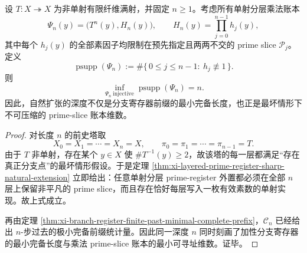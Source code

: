 \begin{corollary}\label{cor:xi-branch-register-depth-primeslice-addressability}
设 \(T:X\twoheadrightarrow X\) 为非单射有限纤维满射，并固定 \(n\ge 1\)。考虑所有单射分层乘法账本
\[
\Psi_n(y)=\bigl(T^n(y),H_n(y)\bigr),
\qquad
H_n(y)=\prod_{j=0}^{n-1}h_j(y),
\]
其中每个 \(h_j(y)\) 的全部素因子均限制在预先指定且两两不交的 prime slice \(\mathcal P_j\)。定义
\[
\operatorname{psupp}(\Psi_n):=\#\{\,0\le j\le n-1:\ h_j\not\equiv 1\,\}.
\]
则
\[
\inf_{\Psi_n\ \mathrm{injective}}\operatorname{psupp}(\Psi_n)=n.
\]
因此，自然扩张的深度不仅是分支寄存器前缀的最小完备长度，也正是最坏情形下不可压缩的 prime-slice 账本维数。
\end{corollary}
\begin{proof}
对长度 \(n\) 的前史塔取
\[
X_0=X_1=\cdots=X_n=X,
\qquad
\pi_0=\pi_1=\cdots=\pi_{n-1}=T.
\]
由于 \(T\) 非单射，存在某个 \(y\in X\) 使 \(\#T^{-1}(y)\ge 2\)，故该塔的每一层都满足“存在真正分支点”的最坏情形假设。于是定理 \ref{thm:xi-layered-prime-register-sharp-natural-extension} 立即给出：任意单射分层 prime-register 外置都必须在全部 \(n\) 层上保留非平凡的 prime slice，而且存在恰好每层写入一枚有效素数的单射实现。故上式成立。

再由定理 \ref{thm:xi-branch-register-finite-past-minimal-complete-prefix}，\(\mathcal C_n\) 已经给出 \(n\)-步过去的极小完备前缀统计量。因此同一深度 \(n\) 同时刻画了加性分支寄存器的最小完备长度与乘法 prime-slice 账本的最小可寻址维数。证毕。
\end{proof}

